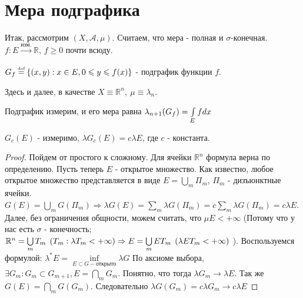 \section{Мера подграфика}

Итак, рассмотрим $\left(X, \mathscr{A}, \mu \right)$. Считаем, что мера - полная и $\sigma$-конечная. 
$f: E \xrightarrow[]{\text{изм.}} \mathbb{R}$, $f \geqslant 0$ почти всюду.
\begin{definition}
	$G_f \defeq \left\{ (x,y) : x \in E, 0 \leqslant y \leqslant f(x) \right\}$ - подграфик функции $f$.
\end{definition}

Здесь и далее, в качестве $X \equiv \mathbb{R}^{n}, \: \mu \equiv \lambda_n$.

\begin{theorem}
	Подграфик измерим, и его мера равна $\lambda_{n + 1}(G_f) = \int\limits_{E} fdx$
\end{theorem}

\begin{statement}
	$G_c(E)$ - измеримо, $\lambda G_c(E) = c \lambda E$, где $c$ - константа.
\end{statement}

\begin{proof}
	Пойдем от простого к сложному. Для ячейки $\mathbb{R}^n$ формула верна по определению. 
	Пусть теперь $E$ - открытое множество. Как известно, любое открытое множество представляется в виде $E = \bigcup\limits_{m} \Pi_m$, $\Pi_m$ - дизъюнктные ячейки.
	$G(E) = \bigcup\limits_{m} G(\Pi_m) \Rightarrow \lambda G(E) = \sum\limits_{m} \lambda G(\Pi_m) = c \sum\limits_{m}\lambda G(\Pi_m) = c\lambda E$.
	Далее, без ограничения общности, можем считать, что $\mu E < +\infty$ (Потому что у нас есть $\sigma$ - конечность; 
	$\\ \mathbb{R}^n = \bigcup\limits_{m}T_m \:\:(T_m : \lambda T_m < +\infty)\Rightarrow E = \bigcup\limits_{m} ET_m \:\: (\lambda ET_m < +\infty)$ ).
	Воспользуемся формулой: $\lambda^{\ast} E = \inf\limits_{E\subset G - \text{открыто}} \lambda G$
	По аксиоме выбора,  $\exists G_m : G_m \subset G_{m + 1}, E = \bigcap\limits_{m} G_m$. Понятно, что тогда $\lambda G_m \rightarrow \lambda E$. 
	Так же $G(E) = \bigcap\limits_{m} G(G_m)$. Следовательно $\lambda G(G_m) =  c\lambda G_m \rightarrow c\lambda E$
\end{proof}

